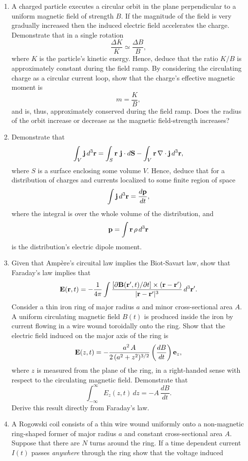 {\begin{enumerate}
\item A charged particle executes a circular orbit  in the
plane perpendicular to a uniform magnetic field of strength $B$. If the magnitude
of the field is very gradually increased then the induced electric field
accelerates the charge. Demonstrate that in a single rotation
$$
\frac{\Delta K}{K} \simeq \frac{\Delta B}{B},
$$
where $K$ is the particle's kinetic energy. Hence, deduce that
the ratio
$K/B$
is approximately constant during the field ramp. By considering the circulating charge as a circular current loop, show that the charge's effective magnetic moment is
$$
m = \frac{K}{B},
$$
and is, thus, approximately conserved during the field ramp. Does the
radius of the orbit increase or decrease as the magnetic  field-strength increases?
\item Demonstrate that
$$
\int_V {\bf j}\,d^3{\bf r} = \int_S {\bf r}\,\,{\bf j}\cdot d{\bf S} - \int_V{\bf r}\,\nabla\cdot{\bf j}\,d^3 {\bf r},
$$
where $S$ is a surface enclosing some volume $V$. Hence, deduce that
for a distribution of charges and currents localized to some finite region of
space
$$
\int {\bf j}\,d^3{\bf r} = \frac{d{\bf p}}{dt},
$$
where the integral is over the whole volume of the distribution, and
$$
{\bf p} = \int {\bf r}\,\rho\,d^3{\bf r}
$$
is the distribution's electric dipole moment.
\item Given that Amp\`{e}re's circuital law implies the Biot-Savart law,
show that Faraday's law implies that
$$
{\bf E}({\bf r},t) = - \frac{1}{4\pi}\int \frac{[\partial {\bf B}({\bf r}',t)/\partial t]
\times ({\bf r}-{\bf r}')}{|{\bf r}-{\bf r}'|^3}\,d^3{\bf r}'.
$$
Consider a thin iron ring of major radius $a$ and minor cross-sectional
area $A$. A uniform circulating magnetic field $B(t)$ is produced inside the iron by current flowing
in a wire wound toroidally onto the ring. Show that the electric field
induced on the major axis of the ring is
$$
{\bf E}(z,t) = - \frac{a^2\,A}{2\,(a^2+z^2)^{3/2}}\left(\frac{d B}{dt}\right){\bf e}_z,
$$
where $z$ is measured from the plane of the ring,  in a right-handed sense
with respect to the circulating magnetic field. Demonstrate that
$$
\int_{-\infty}^\infty E_z(z,t)\,dz = - A\,\frac{dB}{dt}.
$$
Derive this result directly from Faraday's law.
\item A Rogowski coil consists of a thin wire wound uniformly onto a non-magnetic
ring-shaped former of major radius $a$ and constant cross-sectional area $A$. 
Suppose that there are $N$ turns around the ring. If a time dependent current
$I(t)$ passes {\em anywhere}\/ through the ring show that the voltage induced

\end{enumerate}}

